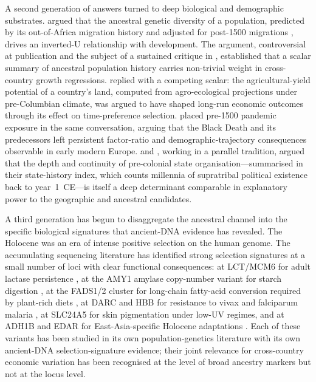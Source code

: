 \documentclass[11pt,letterpaper]{article}
\begin{document}
A second generation of answers turned to deep biological and demographic substrates. \citet{ashraf2013out} argued that the ancestral genetic diversity of a population, predicted by its out-of-Africa migration history and adjusted for post-1500 migrations \citep{putterman2010}, drives an inverted-U relationship with development. The argument, controversial at publication and the subject of a sustained critique in \citet{guedes2013}, established that a scalar summary of ancestral population history carries non-trivial weight in cross-country growth regressions. \citet{galor2016agricultural} replied with a competing scalar: the agricultural-yield potential of a country's land, computed from agro-ecological projections under pre-Columbian climate, was argued to have shaped long-run economic outcomes through its effect on time-preference selection. \citet{voigtlander2013how} placed pre-1500 pandemic exposure in the same conversation, arguing that the Black Death and its predecessors left persistent factor-ratio and demographic-trajectory consequences observable in early modern Europe. \citet{bockstette2002} and \citet{borcan2018}, working in a parallel tradition, argued that the depth and continuity of pre-colonial state organisation---summarised in their state-history index, which counts millennia of supratribal political existence back to year~1~CE---is itself a deep determinant comparable in explanatory power to the geographic and ancestral candidates.

A third generation has begun to disaggregate the ancestral channel into the specific biological signatures that ancient-DNA evidence has revealed. The Holocene was an era of intense positive selection on the human genome. The accumulating sequencing literature has identified strong selection signatures at a small number of loci with clear functional consequences: at LCT/MCM6 for adult lactase persistence \citep{mathieson2015, allentoft2015}, at the AMY1 amylase copy-number variant for starch digestion \citep{perry2007}, at the FADS1/2 cluster for long-chain fatty-acid conversion required by plant-rich diets \citep{ameur2012}, at DARC and HBB for resistance to vivax and falciparum malaria \citep{howes2011, piel2010}, at SLC24A5 for skin pigmentation under low-UV regimes, and at ADH1B and EDAR for East-Asia-specific Holocene adaptations \citep{peng2010, sabeti2007}. Each of these variants has been studied in its own population-genetics literature with its own ancient-DNA selection-signature evidence; their joint relevance for cross-country economic variation has been recognised at the level of broad ancestry markers but not at the locus level.
\end{document}

